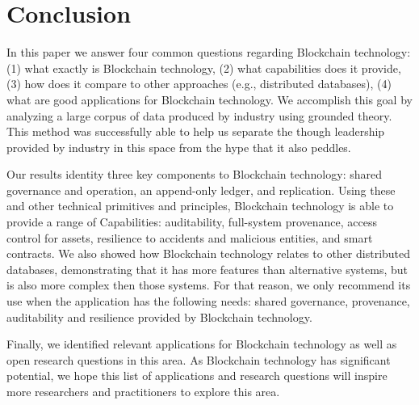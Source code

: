 
\section{Conclusion}
In this paper we answer four common questions regarding Blockchain technology: (1) what exactly is Blockchain technology, (2) what capabilities does it provide, (3) how does it compare to other approaches (e.g., distributed databases), (4) what are good applications for Blockchain technology.
We accomplish this goal by analyzing a large corpus of data produced by industry using grounded theory.
This method was successfully able to help us separate the though leadership provided by industry in this space from the hype that it also peddles.

Our results identity three key components to Blockchain technology: shared governance and operation, an append-only ledger, and replication.
Using these and other technical primitives and principles, Blockchain technology is able to provide a range of Capabilities: auditability, full-system provenance, access control for assets, resilience to accidents and malicious entities, and smart contracts.
We also showed how Blockchain technology relates to other distributed databases, demonstrating that it has more features than alternative systems, but is also more complex then those systems.
For that reason, we only recommend its use when the application has the following needs: shared governance, provenance, auditability and resilience provided by Blockchain technology.

Finally, we identified relevant applications for Blockchain technology as well as open research questions in this area.
As Blockchain technology has significant potential, we hope this list of applications and research questions will inspire more researchers and practitioners to explore this area.